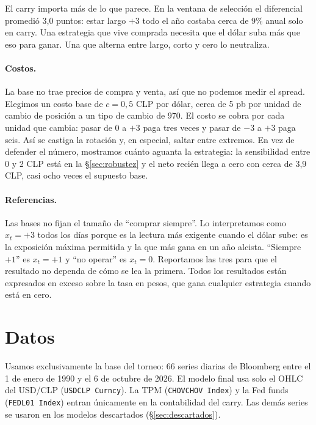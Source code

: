 \documentclass[10pt,a4paper]{article}
\begin{document}
El carry importa más de lo que parece. En la ventana de selección el diferencial
promedió 3,0 puntos: estar largo $+3$ todo el año costaba cerca de 9\% anual solo
en carry. Una estrategia que vive comprada necesita que el dólar suba más que eso
para ganar. Una que alterna entre largo, corto y cero lo neutraliza.

\paragraph{Costos.} La base no trae precios de compra y venta, así que no podemos
medir el spread. Elegimos un costo base de $c=0{,}5$ CLP por dólar, cerca de 5 pb
por unidad de cambio de posición a un tipo de cambio de 970. El costo se cobra por
cada unidad que cambia: pasar de $0$ a $+3$ paga tres veces y pasar de $-3$ a $+3$
paga seis. Así se castiga la rotación y, en especial, saltar entre extremos. En vez
de defender el número, mostramos cuánto aguanta la estrategia: la sensibilidad
entre 0 y 2 CLP está en la §\ref{sec:robustez} y el neto recién llega a cero con
cerca de 3,9 CLP, casi ocho veces el supuesto base.

\paragraph{Referencias.} Las bases no fijan el tamaño de ``comprar siempre''. Lo
interpretamos como $x_t=+3$ todos los días porque es la lectura más exigente
cuando el dólar sube: es la exposición máxima permitida y la que más gana en un
año alcista. ``Siempre $+1$'' es $x_t=+1$ y ``no operar'' es $x_t=0$. Reportamos
las tres para que el resultado no dependa de cómo se lea la primera. Todos los
resultados están expresados en exceso sobre la tasa en pesos, que gana cualquier
estrategia cuando está en cero.

\section{Datos}\label{sec:datos}

Usamos exclusivamente la base del torneo: 66 series diarias de Bloomberg entre
el 1 de enero de 1990 y el 6 de octubre de 2026. El modelo final usa solo el OHLC
del USD/CLP (\texttt{USDCLP Curncy}). La TPM (\texttt{CHOVCHOV Index}) y la Fed
funds (\texttt{FEDL01 Index}) entran únicamente en la contabilidad del carry. Las
demás series se usaron en los modelos descartados (§\ref{sec:descartados}).
\end{document}
